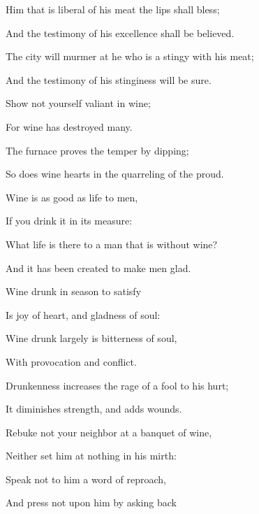 {\par }{\BB \par }{\Q {}Him that is liberal of his meat the lips shall bless;
\par }{\Q And the testimony of his excellence shall be believed.
\par }{\Q {}The city will murmer at he who is a stingy with his meat;
\par }{\Q And the testimony of his stinginess will be sure.
\par }{\BB \par }{\Q {}Show not yourself valiant in wine;
\par }{\Q For wine has destroyed many.
\par }{\Q {}The furnace proves the temper
{} by dipping;
\par }{\Q So does wine
{} hearts in the quarreling of the proud.
\par }{\Q {}Wine is as good as life to men,
\par }{\Q If you drink it in its measure:
\par }{\Q What life is there to a man that is without wine?
\par }{\Q And it has been created to make men glad.
\par }{\Q {}Wine drunk in season
{} to satisfy
\par }{\Q Is joy of heart, and gladness of soul:
\par }{\Q {}Wine drunk largely is bitterness of soul,
\par }{\Q With provocation and conflict.
\par }{\Q {}Drunkenness increases the rage of a fool to his hurt;
\par }{\Q It diminishes strength, and adds wounds.
\par }{\BB \par }{\Q {}Rebuke not your neighbor at a banquet of wine,
\par }{\Q Neither set him at nothing in his mirth:
\par }{\Q Speak not to him a word of reproach,
\par }{\Q And press not upon him by asking back
{}

}
